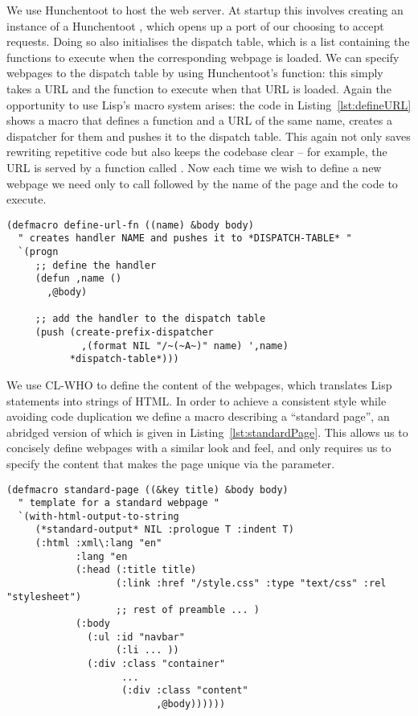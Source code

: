 We use Hunchentoot to host the web server. At startup this involves creating an
instance of a Hunchentoot , which opens up a port of our
choosing to accept requests. Doing so also initialises the dispatch table,
which is a list containing the functions to execute when the corresponding
webpage is loaded. We can specify webpages to the dispatch table by using
Hunchentoot's  function: this simply takes a URL
and the function to execute when that URL is loaded. Again the opportunity to
use Lisp's macro system arises: the code in Listing~\ref{lst:defineURL} shows a
macro that defines a function and a URL of the same name, creates a dispatcher
for them and pushes it to the dispatch table. This again not only saves
rewriting repetitive code but also keeps the codebase clear -- for example, the
URL  is served by a function called . Now each time we
wish to define a new webpage we need only to call  followed
by the name of the page and the code to execute.

\begin{lstlisting}[float,
	label={lst:defineURL},
	caption={Macroising URL functions}]
(defmacro define-url-fn ((name) &body body)
  " creates handler NAME and pushes it to *DISPATCH-TABLE* "
  `(progn
     ;; define the handler
     (defun ,name ()
       ,@body)

     ;; add the handler to the dispatch table
     (push (create-prefix-dispatcher
             ,(format NIL "/~(~A~)" name) ',name)
           *dispatch-table*)))
\end{lstlisting}

We use CL-WHO to define the content of the webpages, which translates Lisp
statements into strings of HTML. In order to achieve a consistent style while
avoiding code duplication we define a macro describing a ``standard page'', an
abridged version of which is given in Listing~\ref{lst:standardPage}. This
allows us to concisely define webpages with a similar look and feel, and only
requires us to specify the content that makes the page unique via the
 parameter.

\begin{lstlisting}[float,
	label={lst:standardPage},
	caption={Macroising webpage definitions}]
(defmacro standard-page ((&key title) &body body)
  " template for a standard webpage "
  `(with-html-output-to-string
     (*standard-output* NIL :prologue T :indent T)
     (:html :xml\:lang "en"
            :lang "en
            (:head (:title title)
                   (:link :href "/style.css" :type "text/css" :rel "stylesheet")
                   ;; rest of preamble ... )
            (:body
              (:ul :id "navbar"
                   (:li ... ))
              (:div :class "container"
                    ...
                    (:div :class "content"
                          ,@body))))))
\end{lstlisting}

